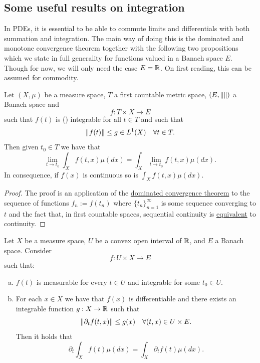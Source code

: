 \documentclass[
    a4paper,
    DIV=14,
    abstract=true,
    numbers=noenddot
]{scrartcl}
\begin{document}
\subsection*{Some useful results on integration}
In PDEs, it is essential to be able to commute limits and differentials with both summation and integration. The main way of doing this is the dominated and monotone convergence theorem  together with the following two propositions which we state in full generality for functions valued in a Banach space $E$. Though for now, we will only need the case $E=\mathbb{R}$. On first reading, this can be assumed for commodity.
\begin{proposition}\label{commuting limits with integral}
	Let $(X,\mu )$ be a measure space, $T$ a first countable metric space, $(E,\left\lVert  \right\rVert)$ a Banach space and
	\[f:T\times X\to E\]
	such that $f(t)$ is () integrable for all ${t}\in{T}$ and such that
	\[\left\lVert f(t) \right\rVert\leq g\in L^1(X)\quad \forall{t}\in {T}.\]
	Then given $t_0\in T$ we have that
	\[\lim_{t\to t_0}\int_X f(t,x)\mu(dx) =\int_X\lim_{t\to t_0}f(t,x)\mu(dx) .\]
	In consequence, if $f(x)$ is continuous so is $\int_X f(t,x) \mu(dx)$.
\end{proposition}
\begin{proof}
	The proof is an application of the \href{https://en.wikipedia.org/wiki/Dominated_convergence_theorem}{dominated convergence theorem} to the
	sequence of functions $f_n:=f(t_n)$ where $\{t_n\}_{n=1}^\infty$ is some sequence converging to $t$ and the fact that, in first countable spaces, sequential continuity is \href{https://en.wikipedia.org/wiki/Sequential_space#Sequential_continuity}{equivalent} to continuity.
\end{proof}
\begin{proposition}\label{derivationundertheintsign}
	Let $X$ be a measure space,  $U$ be a convex open interval of $\mathbb{R}$, and $E$ a Banach space. Consider \[f:U\times X\to E\] such that:
	\begin{enumerate}[a)]
		\item $ f(t)$ is measurable for every $t\in U$ and integrable for some $t_0\in U$.
		\item  For each $x\in X$ we have that $f(x)$ is differentiable and there exists an integrable function $g: X\to\mathbb{R}$ such that
		      \[\left\lVert \partial_{t}{f}(t,x) \right\rVert\leq g(x)\quad \forall{(t,x)}\in {U\times E}.\]
		      Then it holds that
		      \[\partial_{t}{\int_X f(t)\mu(dx)}=\int_X \partial_{t}f(t) \mu(dx).\]

	\end{enumerate}
\end{proposition}
\end{document}

